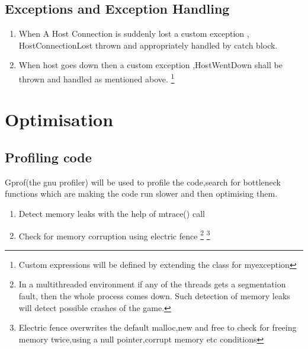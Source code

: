 \documentclass[11pt]{article}
\begin{document}
\subsection{Exceptions and Exception Handling}
\begin{enumerate}
\item When A Host Connection is suddenly lost a custom exception , HostConnectionLost thrown and appropriately handled by catch block.
\item When host goes down then a custom exception ,HostWentDown shall be thrown and handled as mentioned above.
\footnote{Custom expressions will be defined by extending the class for myexception}
\end{enumerate}


\section{Optimisation}
\subsection{Profiling code}
Gprof(the gnu profiler) will be used to profile the code,search for bottleneck functions which are making the code run slower and then optimising them.
\begin{enumerate}
\item{Detect memory leaks with the help of mtrace() call }
\item{Check for memory corruption using electric fence}
\footnote{In a multithreaded environment if any of the threads gets a segmentation fault, then the whole process comes down. Such detection of memory leaks will detect possible crashes of the game.}
\footnote{Electric fence overwrites the default malloc,new and free to check for freeing memory twice,using a null pointer,corrupt memory etc conditions}
\end{enumerate}
\pagebreak
\end{document}
